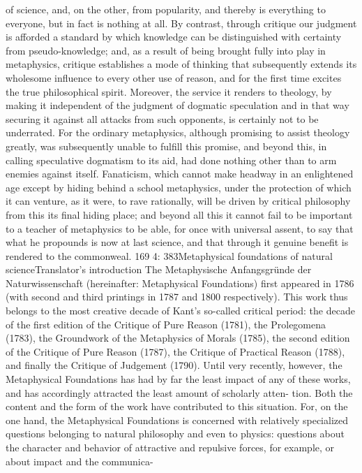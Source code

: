 of science, and, on the other, from popularity, and thereby is everything
to everyone, but in fact is nothing at all. By contrast, through critique our
judgment is afforded a standard by which knowledge can be distinguished
with certainty from pseudo-knowledge; and, as a result of being brought
fully into play in metaphysics, critique establishes a mode of thinking
that subsequently extends its wholesome inﬂuence to every other use
of reason, and for the ﬁrst time excites the true philosophical spirit.
Moreover, the service it renders to theology, by making it independent of
the judgment of dogmatic speculation and in that way securing it against
all attacks from such opponents, is certainly not to be underrated. For the
ordinary metaphysics, although promising to assist theology greatly, was
subsequently unable to fulﬁll this promise, and beyond this, in calling
speculative dogmatism to its aid, had done nothing other than to arm
enemies against itself. Fanaticism, which cannot make headway in an
enlightened age except by hiding behind a school metaphysics, under
the protection of which it can venture, as it were, to rave rationally,
will be driven by critical philosophy from this its ﬁnal hiding place; and
beyond all this it cannot fail to be important to a teacher of metaphysics
to be able, for once with universal assent, to say that what he propounds
is now at last science, and that through it genuine beneﬁt is rendered to
the commonweal.
169
4: 383Metaphysical foundations of natural scienceTranslator’s introduction
The Metaphysische Anfangsgründe der Naturwissenschaft (hereinafter:
Metaphysical Foundations) ﬁrst appeared in 1786 (with second and third
printings in 1787 and 1800 respectively). This work thus belongs to the
most creative decade of Kant’s so-called critical period: the decade of the
ﬁrst edition of the Critique of Pure Reason (1781), the Prolegomena (1783),
the Groundwork of the Metaphysics of Morals (1785), the second edition of
the Critique of Pure Reason (1787), the Critique of Practical Reason (1788),
and ﬁnally the Critique of Judgement (1790). Until very recently, however,
the Metaphysical Foundations has had by far the least impact of any of these
works, and has accordingly attracted the least amount of scholarly atten-
tion. Both the content and the form of the work have contributed to this
situation. For, on the one hand, the Metaphysical Foundations is concerned
with relatively specialized questions belonging to natural philosophy and
even to physics: questions about the character and behavior of attractive
and repulsive forces, for example, or about impact and the communica-
